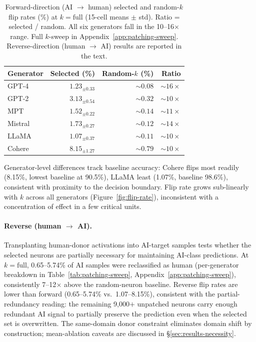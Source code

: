 \documentclass[11pt]{article}
\begin{document}
\begin{table}[t]
\centering
\small
\begin{tabular}{lrrr}
\toprule
Generator & Selected (\%) & Random-$k$ (\%) & Ratio \\
\midrule
GPT-4   & $1.23_{\pm 0.33}$ & ${\sim}0.08$ & ${\sim}16{\times}$ \\
GPT-2   & $3.13_{\pm 0.54}$ & ${\sim}0.32$ & ${\sim}10{\times}$ \\
MPT     & $1.52_{\pm 0.22}$ & ${\sim}0.14$ & ${\sim}11{\times}$ \\
Mistral & $1.73_{\pm 0.27}$ & ${\sim}0.12$ & ${\sim}14{\times}$ \\
LLaMA   & $1.07_{\pm 0.37}$ & ${\sim}0.11$ & ${\sim}10{\times}$ \\
Cohere  & $8.15_{\pm 1.27}$ & ${\sim}0.79$ & ${\sim}10{\times}$ \\
\bottomrule
\end{tabular}
\caption{Forward-direction (AI $\to$ human) selected and random-$k$ flip rates (\%) at $k = \text{full}$ (15-cell means $\pm$ std). Ratio = selected / random. All six generators fall in the 10--16$\times$ range. Full $k$-sweep in Appendix~\ref{app:patching-sweep}. Reverse-direction (human $\to$ AI) results are reported in the text.}
\label{tab:patching-full}
\end{table}

Generator-level differences track baseline accuracy: Cohere flips most readily (8.15\%, lowest baseline at 90.5\%), LLaMA least (1.07\%, baseline 98.6\%), consistent with proximity to the decision boundary. Flip rate grows sub-linearly with $k$ across all generators (Figure~\ref{fig:flip-rate}), inconsistent with a concentration of effect in a few critical units.

\paragraph{Reverse (human $\to$ AI).}
Transplanting human-donor activations into AI-target samples tests whether the selected neurons are partially necessary for maintaining AI-class predictions. At $k = \text{full}$, 0.65--5.74\% of AI samples were reclassified as human (per-generator breakdown in Table~\ref{tab:patching-sweep}, Appendix~\ref{app:patching-sweep}), consistently 7--12$\times$ above the random-neuron baseline. Reverse flip rates are lower than forward (0.65--5.74\% vs.\ 1.07--8.15\%), consistent with the partial-redundancy reading: the remaining 9{,}000$+$ unpatched neurons carry enough redundant AI signal to partially preserve the prediction even when the selected set is overwritten. The same-domain donor constraint eliminates domain shift by construction; mean-ablation caveats are discussed in §\ref{sec:results-necessity}.
\end{document}
